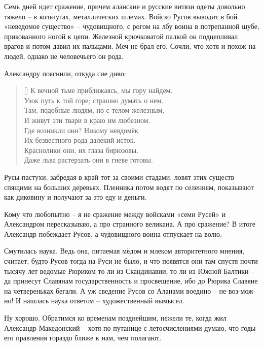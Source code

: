 Семь дней идет сражение, причем аланские и русские витязи одеты довольно тяжело – в кольчугах, металлических шлемах. Войско Русов выводит в бой «неведомое существо» – чудовищного, с рогом на лбу воина в потрепанной шубе, прикованного ногой к цепи. Железной крючковатой палкой он подцепливал врагов и потом давил их пальцами. Меч не брал его. Сочли, что хотя и похож на людей, однако не человечьего он рода.

Александру пояснили, откуда сие диво\cite{nizami01}: 

\settowidth{\versewidth}{К вечной тьме приближаясь, мы гору найдем.} 
\begin{verse}[\versewidth]
К вечной тьме приближаясь, мы гору найдем.\\
Узок путь к той горе; страшно думать о нем.\\

Там, подобные людям, но с телом железным,\\
И живут эти твари в краю им любезном.\\

Где возникли они? Никому невдомёк\\
Их безвестного рода далекий исток.\\

Краснолики они, их глаза бирюзовы.\\
Даже льва растерзать они в гневе готовы.\\
\end{verse}

Русы-пастухи, забредая в край тот за своими стадами, ловят этих существ спящими на больших деревьях. Пленника потом водят по селениям, показывают как диковину и получают за это еду и деньги.

Кому что любопытно – я не сражение между войсками «семи Русей» и Александром пересказываю, а про странного великана. А про сражение? В итоге Александр побеждает Русов, а чудовищного воина отпускает на волю. 

Смутилась наука. Ведь она, питаемая мёдом и млеком авторитетного мнения, считает, будто Русов тогда на Руси не было, и что появятся они там спустя почти тысячу лет ведомые Рюриком то ли из Скандинавии, то ли из Южной Балтики – да принесут Славянам государственность и просвещение, ибо до Рюрика Славяне на четвереньках бегали. А уж сведение Русов со Аланами воедино – не-воз-мож-но! И нашлась наука ответом – художественный вымысел.

Ну хорошо. Обратимся ко временам позднейшим, нежели те, когда жил Александр Македонский – хотя по путанице с летосчислениями думаю, что годы его правления гораздо ближе к нам, чем полагают.

